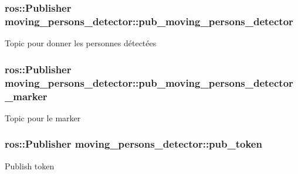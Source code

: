 \subsubsection[{\texorpdfstring{pub\+\_\+moving\+\_\+persons\+\_\+detector}{pub_moving_persons_detector}}]{\setlength{\rightskip}{0pt plus 5cm}ros\+::\+Publisher moving\+\_\+persons\+\_\+detector\+::pub\+\_\+moving\+\_\+persons\+\_\+detector\hspace{0.3cm}{\ttfamily [private]}}\hypertarget{classmoving__persons__detector_a76a32d740a76752eb8d806ed50f1dbdd}{}\label{classmoving__persons__detector_a76a32d740a76752eb8d806ed50f1dbdd}
Topic pour donner les personnes détectées 
\subsubsection[{\texorpdfstring{pub\+\_\+moving\+\_\+persons\+\_\+detector\+\_\+marker}{pub_moving_persons_detector_marker}}]{\setlength{\rightskip}{0pt plus 5cm}ros\+::\+Publisher moving\+\_\+persons\+\_\+detector\+::pub\+\_\+moving\+\_\+persons\+\_\+detector\+\_\+marker\hspace{0.3cm}{\ttfamily [private]}}\hypertarget{classmoving__persons__detector_adb07f5fa4d75d6c8f2e037a9b9e38e7a}{}\label{classmoving__persons__detector_adb07f5fa4d75d6c8f2e037a9b9e38e7a}
Topic pour le marker 
\subsubsection[{\texorpdfstring{pub\+\_\+token}{pub_token}}]{\setlength{\rightskip}{0pt plus 5cm}ros\+::\+Publisher moving\+\_\+persons\+\_\+detector\+::pub\+\_\+token\hspace{0.3cm}{\ttfamily [private]}}\hypertarget{classmoving__persons__detector_af6a77470dc3e40277e9e8e08d4afd7cf}{}\label{classmoving__persons__detector_af6a77470dc3e40277e9e8e08d4afd7cf}
Publish token 
